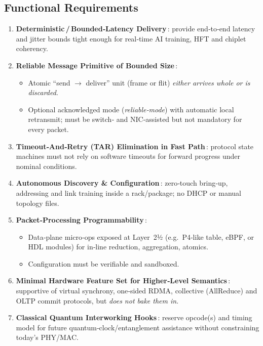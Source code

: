 \documentclass[../../../OAE-SPEC-MAIN.tex]{subfiles}
\begin{document}
\subsection{Functional Requirements}
\begin{enumerate} %
  \item \textbf{Deterministic\,/\,Bounded‑Latency Delivery}\,: provide end‑to‑end latency and jitter bounds tight enough for real‑time AI training, HFT and chiplet coherency.
  \item \textbf{Reliable Message Primitive of Bounded Size}\,:  
        \begin{itemize}
            \item Atomic “send $\rightarrow$ deliver” unit (frame or flit) \emph{either arrives whole or is discarded}.  
            \item Optional acknowledged mode (\textit{reliable‐mode}) with automatic local retransmit; must be switch‑ and NIC‑assisted but not mandatory for every packet.
        \end{itemize}
  \item \textbf{Timeout‐And‐Retry (TAR) Elimination in Fast Path}\,:  
        protocol state machines must not rely on software timeouts for forward progress under nominal conditions.
  \item \textbf{Autonomous Discovery \& Configuration}\,:  
        zero‑touch bring‑up, addressing and link training inside a rack/package; no DHCP or manual topology files.
  \item \textbf{Packet‑Processing Programmability}\,:  
        \begin{itemize}
            \item Data‑plane micro‑ops exposed at Layer 2½ (e.g.\ P4‑like table, eBPF, or HDL modules) for in‑line reduction, aggregation, atomics.  
            \item Configuration must be verifiable and sandboxed.
        \end{itemize}
  \item \textbf{Minimal Hardware Feature Set for Higher‑Level Semantics}\,:  
        supportive of virtual synchrony, one‑sided RDMA, collective (AllReduce) and OLTP commit protocols, but \emph{does not bake them in}.
  \item \textbf{Classical Quantum Interworking Hooks}\,:  
        reserve opcode(s) and timing model for future quantum‑clock/entanglement assistance without constraining today’s PHY/MAC.
\end{enumerate}
\end{document}
